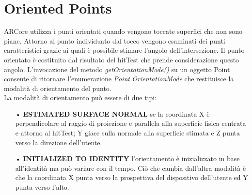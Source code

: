 \documentclass[crop=false, class=book]{standalone}
\begin{document}
		
	\chapter{Oriented Points}
	
		ARCore utilizza i punti orientati quando vengono toccate superfici che non sono piane. Attorno al punto individuato 			dal tocco vengono esaminati dei punti caratteristici grazie ai quali è possibile stimare l'angolo 								dell'intersezione. Il punto orientato è costituito dal risultato del hitTest che prende considerazione questo angolo.
		L'invocazione del metodo \emph{getOrientationMode()} su un oggetto Point consente di ritornare l'enumerazione 					\emph{Point.OrientationMode} che restituisce la modalità di orientamento del punto.\\
		La modalità di orientamento può essere di due tipi:
		\begin{itemize}
			\item[•] \textbf{ESTIMATED SURFACE NORMAL} se la coordinata X è perpendicolare al raggio di proiezione e parallela alla superficie fisica centrata e attorno al hitTest; Y giace sulla normale alla superficie stimata e Z punta verso la direzione dell'utente.
			\item[•] \textbf{INITIALIZED TO IDENTITY} l'orientamento è inizializzato in base all'identità ma può variare con il tempo. Ciò che cambia dall'altra modalità è che la coordinata X punta verso la prospettiva del dispositivo dell'utente ed Y punta verso l'alto.
		\end{itemize}
	
	
		
\end{document}
